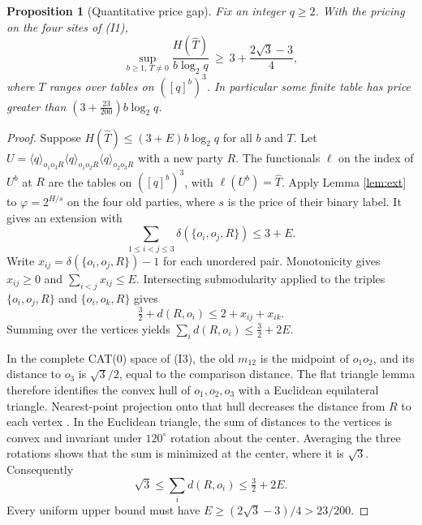 \documentclass[11pt]{article}
\newtheorem{proposition}[theorem]{Proposition}
\theoremstyle{definition}
\newcommand{\unit}[2]{\langle #1\rangle_{#2}}
\begin{document}
\begin{proposition}[Quantitative price gap]\label{prop:expensive}
Fix an integer $q\ge2$. With the pricing on the four sites of (I1),
\[
\sup_{b\ge1,\,T\ne0}\frac{H(\hat T)}{b\log_2q}
 \ \ge\ 3+\frac{2\sqrt3-3}{4},
\]
where $T$ ranges over tables on $([q]^b)^3$. In particular some finite table has price greater than
$(3+\frac{23}{200})b\log_2q$.
\end{proposition}
\begin{proof}
Suppose $H(\hat T)\le (3+E)b\log_2q$ for all $b$ and $T$. Let
$U=\unit q{o_1o_3R}\unit q{o_1o_2R}\unit q{o_2o_3R}$ with a new party $R$. The functionals $\ell$ on the index of $U^b$ at $R$ are the tables on $([q]^b)^3$, with $\ell(U^b)=\hat T$. Apply Lemma \ref{lem:ext} to $\varphi=2^{H/s}$ on the four old parties, where $s$ is the price of their binary label. It gives an extension with
\[
\sum_{1\le i<j\le3}\delta(\{o_i,o_j,R\})\le3+E.
\]
Write $x_{ij}=\delta(\{o_i,o_j,R\})-1$ for each unordered pair. Monotonicity gives $x_{ij}\ge0$ and $\sum_{i<j}x_{ij}\le E$. Intersecting submodularity applied to the triples $\{o_i,o_j,R\}$ and $\{o_i,o_k,R\}$ gives
\[
\tfrac32+d(R,o_i)\le2+x_{ij}+x_{ik}.
\]
Summing over the vertices yields $\sum_i d(R,o_i)\le\tfrac32+2E$.

In the complete CAT(0) space of (I3), the old $m_{12}$ is the midpoint of $o_1o_2$, and its distance to $o_3$ is $\sqrt3/2$, equal to the comparison distance.
The flat triangle lemma \cite[Proposition 2.8]{Bridson} therefore identifies the convex hull of $o_1,o_2,o_3$ with a Euclidean equilateral triangle. Nearest-point projection onto that hull decreases the distance from $R$ to each vertex \cite[Proposition 2.6(1)]{Bridson}. In the Euclidean triangle, the sum of distances to the vertices is convex and invariant under $120^\circ$ rotation about the center. Averaging the three rotations shows that the sum is minimized at the center, where it is $\sqrt3$. Consequently
\[
\sqrt3\le \sum_i d(R,o_i)\le\tfrac32+2E.
\]
Every uniform upper bound must have $E\ge (2\sqrt3-3)/4>23/200$.
\end{proof}
\end{document}

